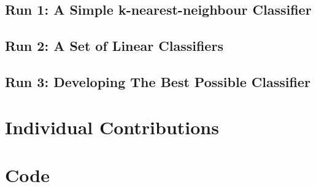 \documentclass[a4paper,12pt]{article}
\begin{document}
\subsection{Run 1: A Simple k-nearest-neighbour Classifier}

\subsection{Run 2: A Set of Linear Classifiers}

\subsection{Run 3: Developing The Best Possible Classifier}


\section{Individual Contributions}


\appendix
\section{Code}
\end{document}
